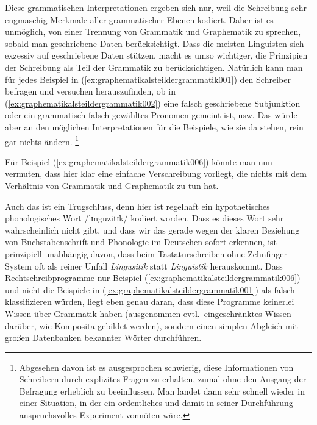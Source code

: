 Diese grammatischen Interpretationen ergeben sich nur, weil die Schreibung sehr engmaschig Merkmale aller grammatischer Ebenen kodiert.
Daher ist es unmöglich, von einer Trennung von Grammatik und Graphematik zu sprechen, sobald man geschriebene Daten berücksichtigt.
Dass die meisten Linguisten sich exzessiv auf geschriebene Daten stützen, macht es umso wichtiger, die Prinzipien der Schreibung als Teil der Grammatik zu berücksichtigen.
Natürlich kann man für jedes Beispiel in (\ref{ex:graphematikalsteildergrammatik001}) den Schreiber befragen und versuchen herauszufinden, ob in (\ref{ex:graphematikalsteildergrammatik002}) eine falsch geschriebene Subjunktion oder ein grammatisch falsch gewähltes Pronomen gemeint ist, usw.
Das würde aber an den möglichen Interpretationen für die Beispiele, wie sie da stehen, rein gar nichts ändern.%
\footnote{Abgesehen davon ist es ausgesprochen schwierig, diese Informationen von Schreibern durch explizites Fragen zu erhalten, zumal ohne den Ausgang der Befragung erheblich zu beeinflussen.
Man landet dann sehr schnell wieder in einer Situation, in der ein ordentliches und damit in seiner Durchführung anspruchsvolles Experiment vonnöten wäre.}

Für Beispiel (\ref{ex:graphematikalsteildergrammatik006}) könnte man nun vermuten, dass hier klar eine einfache Verschreibung vorliegt, die nichts mit dem Verhältnis von Grammatik und Graphematik zu tun hat.

\begin{exe}
\end{exe}

Auch das ist ein Trugschluss, denn hier ist regelhaft ein hypothetisches phonologisches Wort /lɪnguzitɪk/ kodiert worden.
Dass es dieses Wort sehr wahrscheinlich nicht gibt, und dass wir das gerade wegen der klaren Beziehung von Buchstabenschrift und Phonologie im Deutschen sofort erkennen, ist prinzipiell unabhängig davon, dass beim Tastaturschreiben ohne Zehnfinger-System oft als reiner Unfall \textit{Lingusitik} statt \textit{Linguistik} herauskommt.
Dass Rechtschreibprogramme nur Beispiel (\ref{ex:graphematikalsteildergrammatik006}) und nicht die Beispiele in (\ref{ex:graphematikalsteildergrammatik001}) als falsch klassifizieren würden, liegt eben genau daran, dass diese Programme keinerlei Wissen über Grammatik haben (ausgenommen evtl.\ eingeschränktes Wissen darüber, wie Komposita gebildet werden), sondern einen simplen Abgleich mit großen Datenbanken bekannter Wörter durchführen.

